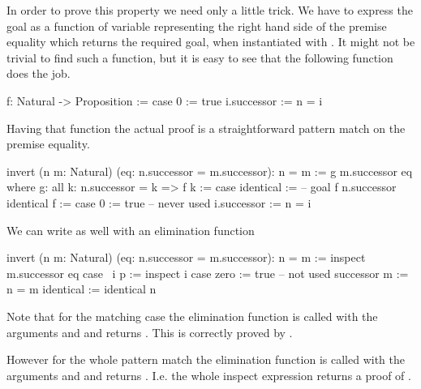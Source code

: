 In order to prove this property we need only a little trick. We have to
express the goal  as a function of variable representing the right
hand side of the premise equality which returns the required goal, when
instantiated with . It might not be trivial to find such a
function, but it is easy to see that the following function does the job.

\begin{alba}
    f: Natural -> Proposition :=
        case 0 :=
                true
             i.successor :=
                n = i
\end{alba}
%
Having that function the actual proof is a straightforward pattern match on the
premise equality.


\begin{alba}
    invert (n m: Natural) (eq: n.successor = m.successor): n = m
    :=
        g m.successor eq
        where
            g: all k: n.successor = k => f k :=
                case identical :=
                    -- goal f n.successor
                    identical
            f :=
                case
                    0 :=
                        true -- never used
                    i.successor :=
                        n = i
\end{alba}


We can write  as well with an elimination function

\begin{alba}
    invert (n m: Natural) (eq: n.successor = m.successor): n = m :=
        inspect
            m.successor
            eq
        case
            {\ i p :=
                inspect i case
                    zero :=
                        true -- not used
                    successor m :=
                        n = m}
            identical :=
                identical n
\end{alba}

Note that for the matching case the elimination function is called with the
arguments  and  and returns .  This is
correctly proved by .

However for the whole pattern match the elimination function is called with the
arguments  and  and returns . I.e. the
whole inspect expression returns a proof of .







